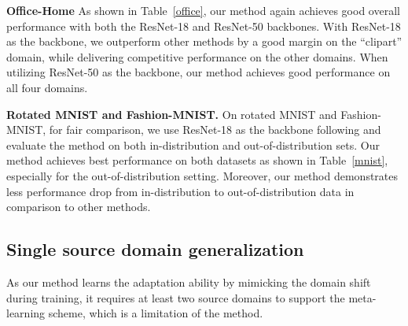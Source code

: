 \documentclass{article} \usepackage[table]{xcolor}
\begin{document}
\textbf{Office-Home} As shown in Table~\ref{office}, our method again achieves good overall performance with both the ResNet-18 and ResNet-50 backbones. 
With ResNet-18 as the backbone, we outperform other methods by a good margin on the ``clipart'' domain, while delivering competitive performance on the other domains.
When utilizing ResNet-50 as the backbone, our method achieves good performance on all four domains.

\textbf{Rotated MNIST and Fashion-MNIST.} 
On rotated MNIST and Fashion-MNIST, for fair comparison, we use ResNet-18 as the backbone following \citep{piratla2020efficient} and evaluate the method on both in-distribution and out-of-distribution sets.
Our method achieves best performance on both datasets as shown in Table~\ref{mnist}, especially for the out-of-distribution setting. Moreover, our method demonstrates less performance drop from in-distribution to out-of-distribution data in comparison to other methods. 


\begin{table}[t]
\begin{center}
\caption{\textbf{Comparison on rotated MNIST and Fashion-MNIST.} 
In-distribution performance is evaluated on the test sets of MNIST and Fashion-MNIST with rotation angles of , , ,  and , while the out-of-distribution performance is evaluated on test sets with angles of  and . We achieve the best performance on both the in-distribution and out-of-distribution test sets.}
\label{mnist}
\end{center}
\end{table}


\subsection{Single source domain generalization}
As our method learns the adaptation ability by mimicking the domain shift during training, it requires at least two source domains to support the meta-learning scheme, which is a limitation of the method.
\end{document}
